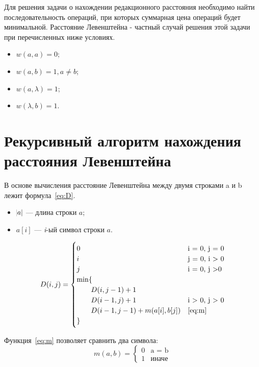 \documentclass[12pt]{report}
\begin{document}
    Для решения задачи о нахождении редакционного расстояния необходимо найти последовательность операций, при которых
    суммарная цена операций будет минимальной. Расстояние Левенштейна - частный случай решения этой задачи
    при перечисленных ниже условиях.
    \begin{itemize}
        \item $w(a, a) = 0$;
        \item $w(a, b) = 1, a \neq b$;
        \item $w(a, \lambda) = 1$;
        \item $w(\lambda, b) = 1$.
    \end{itemize}


    \section{Рекурсивный алгоритм нахождения расстояния Левенштейна}\label{sec:ReccursiveLev}
    В основе вычисления расстояние Левенштейна между двумя строками a и b лежит формула~\ref{eq:D}.
    \begin{itemize}
        \item $\abs{a}$ --- длина строки $a$;
        \item $a[i]$ --- \emph{i}-ый символ строки $a$.
    \end{itemize}

    \begin{equation}
        \label{eq:D}
        D(i, j) = \begin{cases}
                      0 &\text{i = 0, j = 0} \\
                      i &\text{j = 0, i > 0} \\
                      j &\text{i = 0, j >0} \\
                      \min \lbrace \\
                      \qquad D(i, j - 1) + 1 \\
                      \qquad D(i - 1, j) + 1 &\text{i > 0, j > 0} \\
                      \qquad D(i - 1, j - 1) + m(a[i], b[j]) &\text{\ref{eq:m}} \\
                      \rbrace
        \end{cases}
    \end{equation}

    Функция~\ref{eq:m} позволяет сравнить два символа:
    \begin{equation}
        \label{eq:m}
        m(a, b) = \begin{cases}
                      0 &\text{a = b} \\
                      1 &\text{иначе}
        \end{cases}
    \end{equation}
\end{document}
